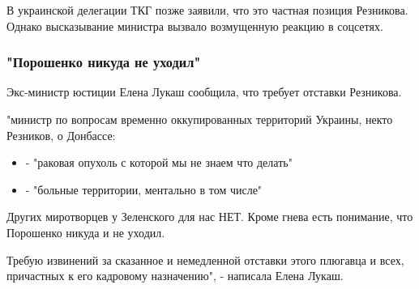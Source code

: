 В украинской делегации ТКГ позже заявили, что это частная позиция Резникова.
Однако высказывание министра вызвало возмущенную реакцию в соцсетях. 

\subsubsection{"Порошенко никуда не уходил"}

Экс-министр юстиции Елена Лукаш сообщила, что требует отставки Резникова.

"министр по вопросам временно оккупированных территорий Украины, некто
Резников, о Донбассе:

\begin{itemize}
	\item - "раковая опухоль с которой мы не знаем что делать" 
	\item - "больные территории, ментально в том числе"
\end{itemize}

Других миротворцев у Зеленского для нас НЕТ.  Кроме гнева есть понимание, что
Порошенко никуда и не уходил.

Требую извинений за сказанное и немедленной отставки этого плюгавца и всех,
причастных к его кадровому назначению", - написала Елена Лукаш.
